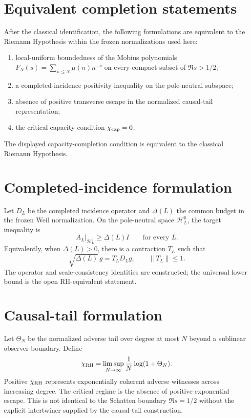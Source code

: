 \documentclass[11pt,a4paper]{article}
\begin{document}
\section{Equivalent completion statements}
After the classical identification, the following formulations are equivalent to the Riemann Hypothesis within the frozen normalizations used here:
\begin{enumerate}
\item local-uniform boundedness of the Mobius polynomials $F_N(s)=\sum_{n\le N}\mu(n)n^{-s}$ on every compact subset of $\Re s>1/2$;
\item a completed-incidence positivity inequality on the pole-neutral subspace;
\item absence of positive transverse escape in the normalized causal-tail representation;
\item the critical capacity condition $\chi_{\rm cap}=0$.
\end{enumerate}

\begin{theorem}
The displayed capacity-completion condition is equivalent to the classical Riemann Hypothesis.
\end{theorem}

\section{Completed-incidence formulation}
Let $D_L$ be the completed incidence operator and $\Delta(L)$ the common budget in the frozen Weil normalization. On the pole-neutral space $\mathcal H_L^0$, the target inequality is
\begin{equation}
A_L\big|_{\mathcal H_L^0}\ge \Delta(L)I
\qquad\text{for every }L.
\end{equation}
Equivalently, when $\Delta(L)>0$, there is a contraction $T_L$ such that
\begin{equation}
\sqrt{\Delta(L)}\,g=T_LD_Lg,
\qquad \|T_L\|\le1.
\end{equation}
The operator and scale-consistency identities are constructed; the universal lower bound is the open RH-equivalent statement.

\section{Causal-tail formulation}
Let $\Theta_N$ be the normalized adverse tail over degree at most $N$ beyond a sublinear observer boundary. Define
\begin{equation}
\chi_{\rm RH}=\limsup_{N\to\infty}\frac1N\log(1+\Theta_N).
\end{equation}
Positive $\chi_{\rm RH}$ represents exponentially coherent adverse witnesses across increasing degree. The critical regime is the absence of positive exponential escape. This is not identical to the Schatten boundary $\Re s=1/2$ without the explicit intertwiner supplied by the causal-tail construction.
\end{document}
